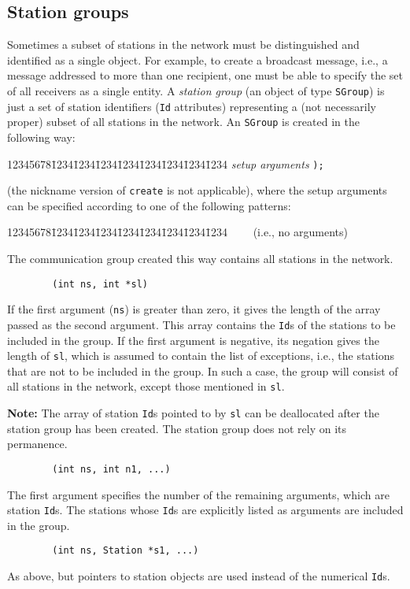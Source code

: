 \subsection{Station groups}
\label{rm_cl_sg}

Sometimes a subset of stations in the network must be distinguished and
identified as a single object.
For example, to create a broadcast message, i.e., a message addressed to
more than one recipient, one must be able to specify the set of all
receivers as a single entity.
A {\em station group\/} (an object of type {\tt SGroup}) is just a
set of station identifiers ({\tt Id} attributes) representing a
(not necessarily proper) subset of all stations in the network.
An {\tt SGroup} is created in the following way:
{\tt\begin{tabbing}
12345678\=1234\=1234\=1234\=1234\=1234\=1234\=1234\=1234\kill
{} {\em setup arguments} {\tt );}
\end{tabbing}}
\noindent
(the nickname version of {\tt create} is not applicable),
where the setup arguments can be specified according to one of the following
patterns:
\begin{tabbing}
12345678\=1234\=1234\=1234\=1234\=1234\=1234\=1234\=1234\kill
\>{\tt ()} \ \ \ \ (i.e., no arguments)
\end{tabbing}
The communication group created this way contains all stations in the network.
\begin{verbatim}
        (int ns, int *sl)
\end{verbatim}
If the first argument ({\tt ns})
is greater than zero, it gives the length of the
array passed as the second argument.
This array contains the {\tt Id}s of the stations to be included in the
group.
If the first argument is negative, its negation gives the length of {\tt sl},
which is assumed to contain the list of exceptions, i.e., the stations that
are not to be included in the group.
In such a case, the group will consist of
all stations in the network, except those mentioned in {\tt sl}.

\medskip

\noindent
{\bf Note:} The array of station {\tt Id}s pointed to by {\tt sl} can be
deallocated after the station group has been created.
The station group does not rely on its permanence.

\medskip

\begin{verbatim}
        (int ns, int n1, ...)
\end{verbatim}
The first argument specifies the number of the remaining arguments, which are
station {\tt Id}s.
The stations whose {\tt Id}s are explicitly listed as arguments are included
in the group.
\begin{verbatim}
        (int ns, Station *s1, ...)
\end{verbatim}
As above, but pointers to station objects are used instead of the numerical
{\tt Id}s.

